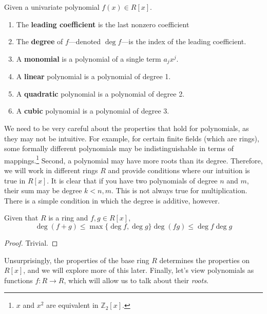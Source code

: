   \begin{definition}
    Given a univariate polynomial $f(x) \in R[x]$. 
    \begin{enumerate} 
      \item The \textbf{leading coefficient} is the last nonzero coefficient  
      \item The \textbf{degree} of $f$---denoted $\deg f$---is the index of the leading coefficient.
      \item A \textbf{monomial} is a polynomial of a single term $a_j x^j$. 
      \item A \textbf{linear} polynomial is a polynomial of degree 1. 
      \item A \textbf{quadratic} polynomial is a polynomial of degree 2. 
      \item A \textbf{cubic} polynomial is a polynomial of degree 3. 
    \end{enumerate}
  \end{definition}

  We need to be very careful about the properties that hold for polynomials, as they may not be intuitive. For example, for certain finite fields (which are rings), some formally different polynomials may be indistinguishable in terms of mappings.\footnote{$x$ and $x^2$ are equivalent in  $\mathbb{Z}_2 [x]$. } Second, a polynomial may have more roots than its degree. Therefore, we will work in different rings $R$ and provide conditions where our intuition is true in $R[x]$. It is clear that if you have two polynomials of degree $n$ and $m$, their sum may be degree $k < n, m$. This is not always true for multiplication. There is a simple condition in which the degree is additive, however. 

  \begin{lemma}
    Given that $R$ is a ring and $f, g \in R[x]$, 
    \begin{equation}
      \deg(f+g) \leq \max\{\deg f, \deg g\}
      \deg(fg) \leq \deg f \deg g
    \end{equation}
  \end{lemma}
  \begin{proof}
    Trivial. 
  \end{proof}

  Unsurprisingly, the properties of the base ring $R$ determines the properties on $R[x]$, and we will explore more of this later. Finally, let's view polynomials as functions $f: R \to R$, which will allow us to talk about their \textit{roots}. 

